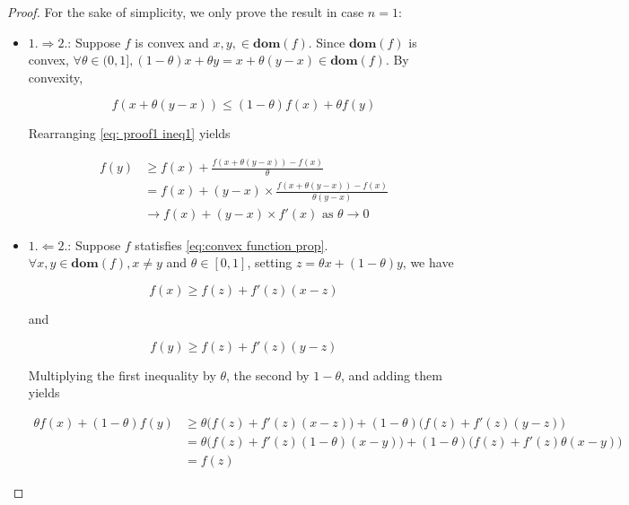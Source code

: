 \documentclass[12pt]{article} %
\theoremstyle{definition}
\begin{document}
\begin{proof}
	For the sake of simplicity, we only prove the result in case $n = 1$:

	\begin{itemize}
			\item $1. \Rightarrow 2.$: Suppose $f$ is convex and $x, y, \in \mathbf{dom}(f)$. Since $\mathbf{dom}(f)$ is convex, $\forall \theta \in (0, 1], (1 - \theta) x + \theta y = x + \theta (y - x) \in \mathbf{dom}(f)$. By convexity,
	
		\begin{ceqn}
			\begin{equation}
				f(x + \theta (y - x)) \le (1 - \theta) f(x) + \theta f(y)
				\label{eq: proof1 ineq1}
			\end{equation}
		\end{ceqn}
	
		Rearranging \eqref{eq: proof1 ineq1} yields
	
		\begin{ceqn}
			\begin{align*}
				f(y)
				&\ge f(x) + \frac{f(x + \theta (y - x)) - f(x)}{\theta} \\
				&= f(x) + (y - x) \times \frac{f(x + \theta (y - x)) - f(x)}{\theta (y - x)} \\
				&\rightarrow f(x) + (y - x) \times f'(x) \text{ as } \theta \rightarrow 0
			\end{align*}
		\end{ceqn}

		\item $1. \Leftarrow 2.$: Suppose $f$ statisfies \eqref{eq:convex function prop}. $\forall x, y \in \mathbf{dom}(f), x \ne y$ and $\theta \in [0, 1]$,  setting $z = \theta x + (1 - \theta) y$, we have

		$$
			f(x) \ge f(z) + f'(z) (x - z)
		$$

		and 

		$$
			f(y) \ge f(z) + f'(z) (y - z)
		$$

		 Multiplying the first inequality by $\theta$, the second by $1 - \theta$, and adding them yields

		\begin{ceqn}
			\begin{align*}
				\theta f(x) + (1 - \theta) f(y)
				&\ge \theta \big( f(z) + f'(z) (x - z) \big) + (1 - \theta)  \big( f(z) + f'(z) (y - z) \big) \\
				&= \theta \big( f(z) + f'(z) (1 - \theta) (x - y) \big) + (1 - \theta)  \big( f(z) + f'(z) \theta (x - y) \big) \\
				&= f(z)
			\end{align*}
		\end{ceqn}


\end{itemize}
\end{proof}
\end{document}
